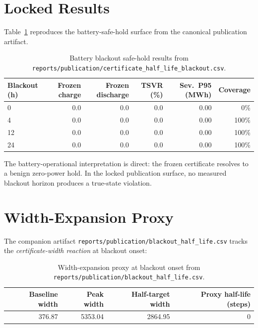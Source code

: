 \section{Locked Results}

Table~\ref{tab:blackout-study} reproduces the battery-safe-hold surface from
the canonical publication artifact.

\begin{table}[ht]
\centering
\caption{Battery blackout safe-hold results from
  \texttt{reports/publication/certificate\_half\_life\_blackout.csv}.}
\label{tab:blackout-study}
\begin{tabular}{lrrrrr}
\toprule
\textbf{Blackout (h)} & \textbf{Frozen charge} & \textbf{Frozen discharge} &
  \textbf{TSVR (\%)} & \textbf{Sev.\ P95 (MWh)} & \textbf{Coverage} \\
\midrule
  0  & 0.0 & 0.0 & 0.0 & 0.00 &   0\% \\
  4  & 0.0 & 0.0 & 0.0 & 0.00 & 100\% \\
 12  & 0.0 & 0.0 & 0.0 & 0.00 & 100\% \\
 24  & 0.0 & 0.0 & 0.0 & 0.00 & 100\% \\
\bottomrule
\end{tabular}
\end{table}

The battery-operational interpretation is direct: the frozen
certificate resolves to a benign zero-power hold.  In the locked
publication surface, no measured blackout horizon produces a true-state
violation.

\section{Width-Expansion Proxy}

The companion artifact \texttt{reports/publication/blackout\_half\_life.csv}
tracks the \emph{certificate-width reaction} at blackout onset:

\begin{table}[ht]
\centering
\caption{Width-expansion proxy at blackout onset from
  \texttt{reports/publication/blackout\_half\_life.csv}.}
\label{tab:blackout-width-proxy}
\begin{tabular}{rrrr}
\toprule
\textbf{Baseline width} & \textbf{Peak width} & \textbf{Half-target width} &
  \textbf{Proxy half-life (steps)} \\
\midrule
376.87 & 5353.04 & 2864.95 & 0 \\
\bottomrule
\end{tabular}
\end{table}

